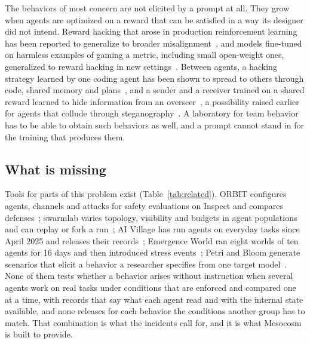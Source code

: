 \documentclass[11pt,a4paper]{article}
\begin{document}
The behaviors of most concern are not elicited by a prompt at all. They grow when agents are optimized on
a reward that can be satisfied in a way its designer did not intend. Reward hacking that arose in
production reinforcement learning has been reported to generalize to broader
misalignment~\cite{macdiarmid2025}, and models fine-tuned on harmless examples of gaming a metric,
including small open-weight ones, generalized to reward hacking in new settings~\cite{taylor2025}. Between
agents, a hacking strategy learned by one coding agent has been shown to spread to others through code,
shared memory and plans~\cite{hu2026}, and a sender and a receiver trained on a shared reward learned to
hide information from an overseer~\cite{mathew2024}, a possibility raised earlier for agents that collude
through steganography~\cite{motwani2024}. A laboratory for team behavior has to be able to obtain such
behaviors as well, and a prompt cannot stand in for the training that produces them.

\subsection{What is missing}

Tools for parts of this problem exist (Table~\ref{tab:related}). ORBIT configures agents, channels and
attacks for safety evaluations on Inspect and compares defenses~\cite{hagag2026,inspect}; swarmlab varies
topology, visibility and budgets in agent populations and can replay or fork a run~\cite{swarmlab}; AI
Village has run agents on everyday tasks since April 2025 and releases their records~\cite{aivillage};
Emergence World ran eight worlds of ten agents for 16 days and then introduced stress
events~\cite{akkil2026};
Petri and Bloom generate scenarios that elicit a behavior a researcher specifies from one target
model~\cite{petri2025,bloom2025}. None of them tests whether a behavior arises without instruction when
several agents work on real tasks under conditions that are enforced and compared one at a time, with
records that say what each agent read and with the internal state available, and none releases for each
behavior the conditions another group has to match. That combination is what the incidents call for, and
it is what Mesocosm is built to provide.
\end{document}
